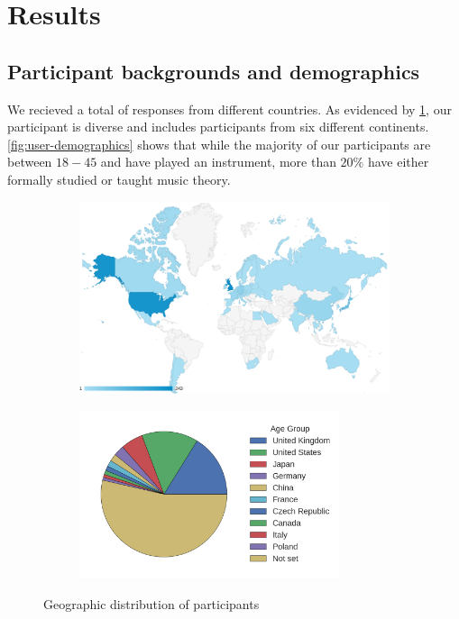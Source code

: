 \documentclass[dissertation.tex]{subfiles}
\begin{document}
\section{Results}

\subsection{Participant backgrounds and demographics}

We recieved a total of  responses from  different countries. As evidenced by \cref{fig:user-geographics},
our participant is diverse and includes participants from six different continents.
\cref{fig:user-demographics} shows that while the majority of our participants
are between $18-45$ and have played an instrument, more than $20\%$
have either formally studied or taught music theory.

\begin{figure}[htpb]
  \centering
  \begin{subfigure}[b]{0.98\textwidth}
    \centering
    \includegraphics[width=0.85\linewidth]{Figures/participants-by-country.png}
  \end{subfigure}
  \begin{subfigure}[c]{0.55\textwidth}
    \centering
    \hspace{-1cm}\includegraphics[width=3in]{Figures/user-demographics-pie.png}
  \end{subfigure}
  \begin{subfigure}[c]{0.44\textwidth}
    \centering
    
  \end{subfigure}
  \caption{Geographic distribution of participants}
  \label{fig:user-geographics}
\end{figure}
\end{document}
